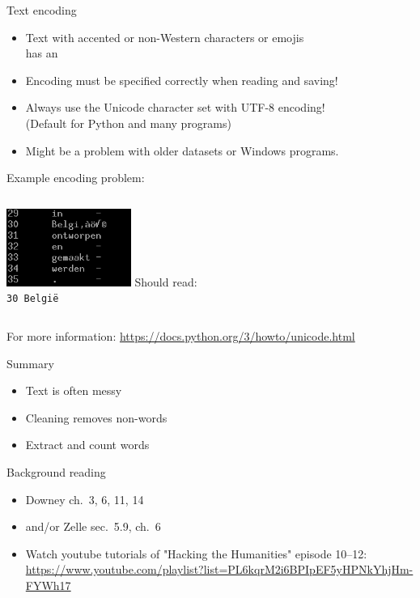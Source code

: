 \documentclass[aspectratio=169,usenames,dvipsnames]{beamer}
\begin{document}
\begin{frame}{Text encoding}
    \begin{itemize}
        \item Text with accented or non-Western characters or emojis \\
            has an 
        \item Encoding must be specified correctly when reading and saving!
        \item Always use the Unicode character set with UTF-8 encoding! \\
            (Default for Python and many programs)
        \item Might be a problem with older datasets or Windows programs.
    \end{itemize}
  
    Example encoding problem:

    \begin{columns}
    \centering
         \includegraphics[width=0.5\textwidth]{fig/encodingissue}
        Should read:\\
        \texttt{30   Belgi\"e}
        \vspace{3em}
    \end{columns}

    \vspace{1em}
    For more information: \url{https://docs.python.org/3/howto/unicode.html}
\end{frame}

\begin{frame}{Summary}
    \begin{itemize}
        \item Text is often messy
        \item Cleaning removes non-words
        \item Extract and count words
    \end{itemize}
\end{frame}




\begin{frame}{Background reading}
    \begin{itemize}
        \item Downey ch.\ 3, 6, 11, 14
        \item and/or Zelle sec.\ 5.9, ch.\ 6
        \item Watch youtube tutorials of "Hacking the Humanities" episode 10--12:
            {\small \url{https://www.youtube.com/playlist?list=PL6kqrM2i6BPIpEF5yHPNkYhjHm-FYWh17}}
    \end{itemize}
\end{frame}
\end{document}
